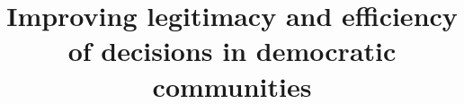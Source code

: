\documentclass[chi_draft]{sigchi}
\begin{document}
\title{Improving legitimacy and efficiency \\ of decisions in democratic communities}


\maketitle

\begin{abstract}
\end{abstract}

%
\end{document}
